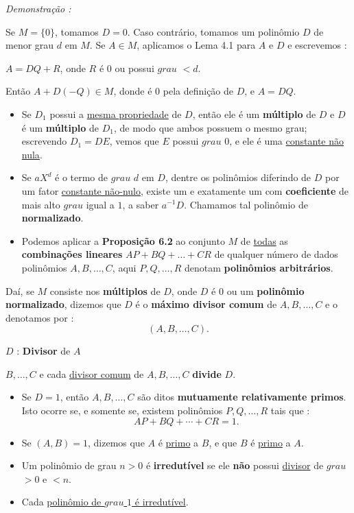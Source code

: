     \textit{Demonstração : }

        Se $M = \{0\}$, tomamos $D = 0$. Caso contrário, tomamos um polinômio $D$ 
        de menor grau $d$ em $M$. Se $A \in M$, aplicamos o Lema 4.1 para $A$ e $D$ e escrevemos : 
        \begin{center}
        $A = DQ + R$, onde $R$ é $0$ ou possui $grau$ $< d$. 
        \end{center}

    Então $A + D(-Q) \in M$, donde é $0$ pela definição de $D$, e $A = DQ$. 

    \begin{itemize}[left=0.5cm, align=left, nosep]
        \item Se $D_{1}$ possui a \underline{mesma propriedade} de $D$, então ele é um \textbf{múltiplo} de $D$ e $D$ é um \textbf{múltiplo} de $D_{1}$, 
        de modo que ambos possuem o mesmo grau; escrevendo $D_{1} = DE$, vemos que $E$ possui $grau$ $0$, e 
        ele é uma \underline{constante não nula}.
        \item Se $aX^{d}$ é o termo de $grau$ $d$ em $D$, dentre os polinômios diferindo de $D$ por um fator \underline{constante não-nulo},
        existe um e exatamente um com \textbf{coeficiente} de mais alto $grau$ igual a $1$, a saber $a^{-1}D$. Chamamos tal
        polinômio de \textbf{normalizado}.
        \item Podemos aplicar a \textbf{Proposição 6.2} ao conjunto $M$ de \underline{todas} as \textbf{combinações lineares} 
        $AP + BQ + \ldots + CR$ de qualquer número de dados polinômios $A, B, \ldots, C$, aqui $P, Q, \ldots, R$ 
        denotam \textbf{polinômios arbitrários}. 

    \end{itemize}

    Daí, se $M$ consiste nos \textbf{múltiplos} de $D$, onde $D$ é $0$ ou um \textbf{polinômio normalizado}, dizemos que 
    $D$ é o \textbf{máximo divisor comum} de $A, B, \ldots, C$ e o denotamos por :
    \[
    (A, B, \ldots, C).
    \]

    $D$ : \textbf{Divisor} de $A$ 

    $B, \ldots, C$ e cada \underline{divisor comum} de $A, B, \ldots, C$ \textbf{divide} $D$.

    \begin{itemize}[left=0.5cm, align=left, nosep]
        \item  Se $D = 1$, então $A, B, \ldots, C$ são ditos \textbf{mutuamente relativamente primos}. Isto ocorre se, e 
        somente se, existem polinômios $P, Q, \ldots, R$ tais que : 
            \[
                \boxed{AP + BQ + \cdots + CR = 1}.
            \]
        \item Se $(A, B) = 1$, dizemos que $A$ é \underline{primo} a $B$, e que $B$ é \underline{primo} a $A$.
        \item Um polinômio de grau $n > 0$ é \textbf{irredutível} se ele \textbf{não} possui \underline{divisor} de $grau$ $> 0$ e $< n$. 
        \item Cada \underline{polinômio de $grau$ $1$ é irredutível}.   
    \end{itemize}

